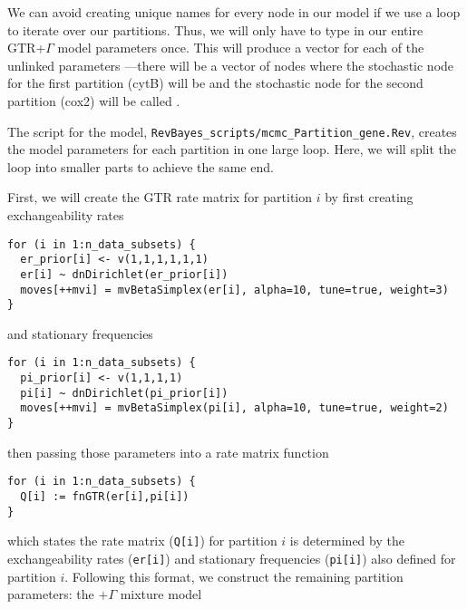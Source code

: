 We can avoid creating unique names for every node in our model if we use a  loop to iterate over our partitions. Thus, we will only have to type in our entire GTR+$\Gamma$ model parameters once. 
This will produce a vector for each of the unlinked parameters ---\EG there will be a vector of  nodes where the stochastic node for the first partition (cytB) will be  and the stochastic node for the second partition (cox2) will be called .

The script for the model, {\tt RevBayes\_scripts/mcmc\_Partition\_gene.Rev}, creates the model parameters for each partition in one large loop.
Here, we will split the loop into smaller parts to achieve the same end.

First, we will create the GTR rate matrix for partition $i$ by first creating exchangeability rates
{\tt \small \begin{snugshade*}
\begin{lstlisting}
for (i in 1:n_data_subsets) {
  er_prior[i] <- v(1,1,1,1,1,1)
  er[i] ~ dnDirichlet(er_prior[i])
  moves[++mvi] = mvBetaSimplex(er[i], alpha=10, tune=true, weight=3) 
}
\end{lstlisting}
\end{snugshade*}}

and stationary frequencies

{\tt \small \begin{snugshade*}
\begin{lstlisting}
for (i in 1:n_data_subsets) {
  pi_prior[i] <- v(1,1,1,1)
  pi[i] ~ dnDirichlet(pi_prior[i])
  moves[++mvi] = mvBetaSimplex(pi[i], alpha=10, tune=true, weight=2)
}
\end{lstlisting}
\end{snugshade*}}

then passing those parameters into a rate matrix function

{\tt \small \begin{snugshade*}
\begin{lstlisting}
for (i in 1:n_data_subsets) {
  Q[i] := fnGTR(er[i],pi[i]) 
}
\end{lstlisting}
\end{snugshade*}}

which states the rate matrix ({\tt Q[i]}) for partition $i$ is determined by the exchangeability rates ({\tt er[i]}) and stationary frequencies ({\tt pi[i]}) also defined for partition $i$.
Following this format, we construct the remaining partition parameters: the $+\Gamma$ mixture model

